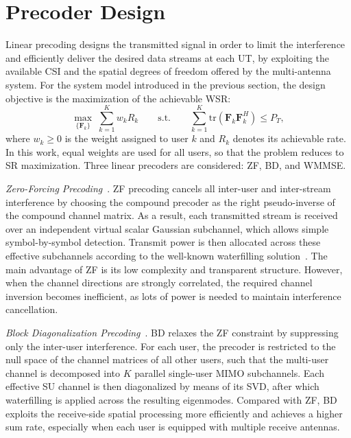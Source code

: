 \documentclass[conference]{IEEEtran}
\begin{document}
\section{Precoder Design}
\label{section:precoder_design}

Linear precoding designs the transmitted signal in order to limit the interference and efficiently deliver the desired data streams at each \ac{UT}, by exploiting the available \ac{CSI} and the spatial degrees of freedom offered by the multi-antenna system.
For the system model introduced in the previous section, the design objective is the maximization of the achievable \ac{WSR}:
\begin{equation}
\label{eq:wsr_problem}
    \max_{\{\mathbf{F}_k\}} \; \sum_{k=1}^{K} w_k R_k 
    \qquad \text{s.t.} \qquad
    \sum_{k=1}^{K} \mathrm{tr}\!\left(\mathbf{F}_k \mathbf{F}_k^H\right) \leq P_T,
\end{equation}
where $w_k \geq 0$ is the weight assigned to user $k$ and $R_k$ denotes its achievable rate.
In this work, equal weights are used for all users, so that the problem reduces to \ac{SR} maximization.
Three linear precoders are considered: \ac{ZF}, \ac{BD}, and \ac{WMMSE}.

\textit{Zero-Forcing Precoding}~\cite{ZF}.
\ac{ZF} precoding cancels all inter-user and inter-stream interference by choosing the compound precoder as the right pseudo-inverse of the compound channel matrix.
As a result, each transmitted stream is received over an independent virtual scalar Gaussian subchannel, which allows simple symbol-by-symbol detection.
Transmit power is then allocated across these effective subchannels according to the well-known waterfilling solution~\cite{geometric_waterfilling}.
The main advantage of \ac{ZF} is its low complexity and transparent structure.
However, when the channel directions are strongly correlated, the required channel inversion becomes inefficient, as lots of power is needed to maintain interference cancellation.

\textit{Block Diagonalization Precoding}~\cite{BD}.
\ac{BD} relaxes the \ac{ZF} constraint by suppressing only the inter-user interference.
For each user, the precoder is restricted to the null space of the channel matrices of all other users, such that the multi-user channel is decomposed into $K$ parallel single-user \ac{MIMO} subchannels.
Each effective \ac{SU} channel is then diagonalized by means of its \ac{SVD}, after which waterfilling is applied across the resulting eigenmodes.
Compared with \ac{ZF}, \ac{BD} exploits the receive-side spatial processing more efficiently and achieves a higher sum rate, especially when each user is equipped with multiple receive antennas.
\end{document}

